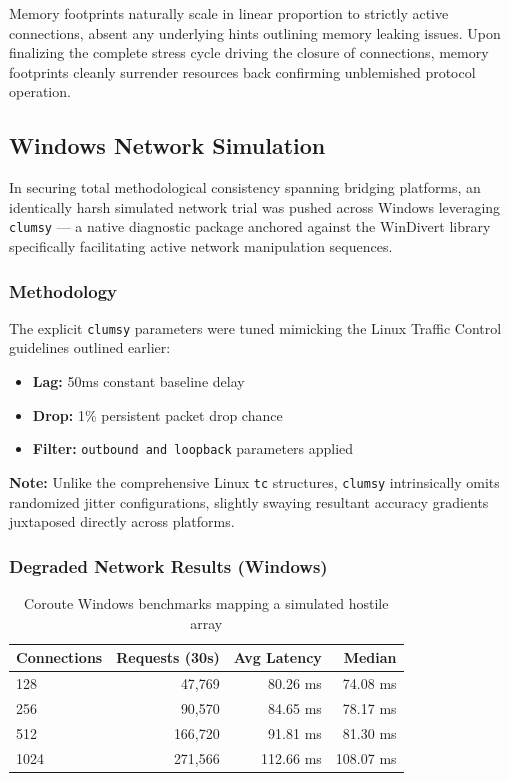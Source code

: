Memory footprints naturally scale in linear proportion to strictly active connections, absent any underlying hints outlining memory leaking issues. Upon finalizing the complete stress cycle driving the closure of connections, memory footprints cleanly surrender resources back confirming unblemished protocol operation.

\subsection{Windows Network Simulation}

In securing total methodological consistency spanning bridging platforms, an identically harsh simulated network trial was pushed across Windows leveraging \texttt{clumsy} \cite{clumsy} --- a native diagnostic package anchored against the WinDivert library specifically facilitating active network manipulation sequences.

\subsubsection{Methodology}

The explicit \texttt{clumsy} parameters were tuned mimicking the Linux Traffic Control guidelines outlined earlier:
\begin{itemize}
    \item \textbf{Lag:} 50ms constant baseline delay
    \item \textbf{Drop:} 1\% persistent packet drop chance
    \item \textbf{Filter:} \texttt{outbound and loopback} parameters applied
\end{itemize}

\textbf{Note:} Unlike the comprehensive Linux \texttt{tc} structures, \texttt{clumsy} intrinsically omits randomized jitter configurations, slightly swaying resultant accuracy gradients juxtaposed directly across platforms.

\subsubsection{Degraded Network Results (Windows)}

\begin{table}[H]
\centering
\caption{Coroute Windows benchmarks mapping a simulated hostile array}
\label{tab:windows_hostile}
\begin{tabular}{|l|r|r|r|}
\hline
\textbf{Connections} & \textbf{Requests (30s)} & \textbf{Avg Latency} & \textbf{Median} \\
\hline
128 & 47,769 & 80.26 ms & 74.08 ms \\
256 & 90,570 & 84.65 ms & 78.17 ms \\
512 & 166,720 & 91.81 ms & 81.30 ms \\
1024 & 271,566 & 112.66 ms & 108.07 ms \\
\hline
\end{tabular}
\end{table}


